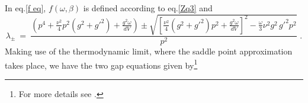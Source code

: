 In eq.\eqref{f eq}, $f(\omega,\beta)$ is defined according to eq.\eqref{Zq3} and
\begin{equation}
\lambda_{\pm} ~=~ \frac{\left( p^{4} + \frac{\nu^{2}}{4} p^{2}(g^{2} + g'^{2}) + \frac{g^{2}\omega}{dV} \right) \pm \sqrt{\left[ \frac{\nu^{2}}{4}(g^{2} + g'^{2})p^{2} + \frac{g^{2}\omega}{dV}\right]^{2} - \frac{\omega}{3}\nu^{2}g^{2}\,g'^{2}p^{2}}}{p^{2}}  \;. 
\label{ev1}
\end{equation}
Making use of the thermodynamic limit, where the saddle point approximation takes place, we have the two gap equations given by\footnote{For more details see \cite{Capri:2013oja,Capri:2013gha,Capri:2012ah}.}

